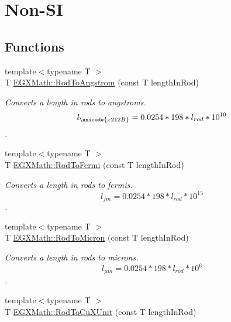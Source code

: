 \hypertarget{group___e_g_x_math-_conversions-_length_conversions-_surveyors-_rod-_non-_s_i}{}\section{Non-\/\+SI}
\label{group___e_g_x_math-_conversions-_length_conversions-_surveyors-_rod-_non-_s_i}
\subsection*{Functions}
\begin{DoxyCompactItemize}
\item 
{\footnotesize template$<$typename T $>$ }\\T \mbox{\hyperlink{group___e_g_x_math-_conversions-_length_conversions-_surveyors-_rod-_non-_s_i_ga079b9122c8747685d7057ec05fefdb7f}{E\+G\+X\+Math\+::\+Rod\+To\+Angstrom}} (const T length\+In\+Rod)
\begin{DoxyCompactList}\small\item\em Converts a length in rods to angstroms. \[ l_{\unicode{x212B}}=0.0254 * 198 * l_{rod} * 10^{10} \]. \end{DoxyCompactList}\item 
{\footnotesize template$<$typename T $>$ }\\T \mbox{\hyperlink{group___e_g_x_math-_conversions-_length_conversions-_surveyors-_rod-_non-_s_i_ga8397c0761e32cb6cfa632854d26023a5}{E\+G\+X\+Math\+::\+Rod\+To\+Fermi}} (const T length\+In\+Rod)
\begin{DoxyCompactList}\small\item\em Converts a length in rods to fermis. \[ l_{fm}=0.0254 * 198 * l_{rod} * 10^{15} \]. \end{DoxyCompactList}\item 
{\footnotesize template$<$typename T $>$ }\\T \mbox{\hyperlink{group___e_g_x_math-_conversions-_length_conversions-_surveyors-_rod-_non-_s_i_ga91daf7bb89d486f6c8523a5436e5599d}{E\+G\+X\+Math\+::\+Rod\+To\+Micron}} (const T length\+In\+Rod)
\begin{DoxyCompactList}\small\item\em Converts a length in rods to microns. \[ l_{\mu m}=0.0254 * 198 * l_{rod} * 10^{6} \]. \end{DoxyCompactList}\item 
{\footnotesize template$<$typename T $>$ }\\T \mbox{\hyperlink{group___e_g_x_math-_conversions-_length_conversions-_surveyors-_rod-_non-_s_i_gac344dc1fbafaa0451704947bf33a8594}{E\+G\+X\+Math\+::\+Rod\+To\+Cu\+X\+Unit}} (const T length\+In\+Rod)

\end{DoxyCompactItemize}
